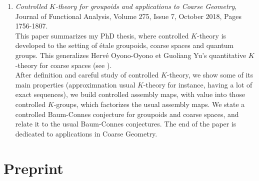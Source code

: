 \documentclass[a4paper]{article}
\begin{document}
\begin{enumerate}
\item \textit{Controlled $K$-theory for groupoids and applications to Coarse Geometry}, Journal of Functional Analysis, Volume 275, Issue 7, October 2018, Pages 1756-1807. \\

This paper summarizes my PhD thesis, where controlled $K$-theory is developed to the setting of \'etale groupoids, coarse spaces and quantum groups. This generalizes Herv\'e Oyono-Oyono et Guoliang Yu's quantitative $K$-theory for coarse spaces (see \cite{OY1}\cite{OY2}\cite{OY3}\cite{oyono2019quantitative}). \\

After definition and careful study of controlled $K$-theory, we show some of its main properties (approximnation usual $K$-theory for instance, having a lot of exact sequences), we build controlled assembly maps, with value into those controlled $K$-groups, which factorizes the usual assembly maps. We state a controlled Baum-Connes conjecture for groupoids and coarse spaces, and relate it to the usual Baum-Connes conjectures. The end of the paper is dedicated to applications in Coarse Geometry.                                                                                                                                           
\end{enumerate}

\section*{Preprint}
\end{document}
